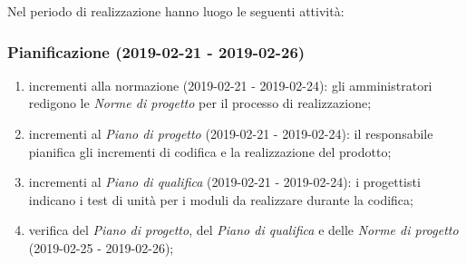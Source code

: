 Nel periodo di realizzazione hanno luogo le seguenti attività:
		\subsubsection{Pianificazione (2019-02-21 - 2019-02-26)}
			\begin{enumerate}[label= 4.1.\arabic*)]
				\item incrementi alla normazione (2019-02-21 - 2019-02-24): gli amministratori redigono le \textit{Norme di progetto} per il processo di realizzazione;
				\item incrementi al \textit{Piano di progetto} (2019-02-21 - 2019-02-24): il responsabile pianifica gli incrementi di codifica e la realizzazione del prodotto;
				\item incrementi al \textit{Piano di qualifica} (2019-02-21 - 2019-02-24): i progettisti indicano i test di unità per i moduli da realizzare durante la codifica;
				\item verifica del \textit{Piano di progetto}, del \textit{Piano di qualifica} e delle \textit{Norme di progetto} (2019-02-25 - 2019-02-26);
			\end{enumerate}
